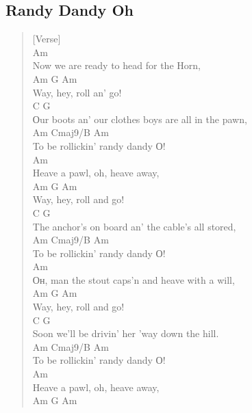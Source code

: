 \documentclass[11pt]{article}
\begin{document}
\subsection{Randy Dandy Oh}
\label{sec:org2eb318b}
\begin{verse}
[Verse]\\
\hspace*{1em}Am\\
Now we are ready to head for the Horn,\\
Am   G    Am\\
Way, hey, roll an' go!\\
\hspace*{4em}C                              G\\
Оur boots an' our clothes boys are all in the pawn,\\
\hspace*{6em}Am              Cmaj9/B  Am\\
To be rollickin' randy dandy О!\\
\vspace*{1em}
Am\\
Heave a pawl, oh, heave away,\\
Am   G    Am\\
Way, hey, roll and go!\\
\hspace*{5em}C                        G\\
The anchor's on board an' the cable's all stored,\\
\hspace*{7em}Am              Cmaj9/B  Am\\
To be rollickin' randy dandy О!\\
\vspace*{1em}
Am\\
Он, man the stout caps'n and heave with a will,\\
Am   G    Am\\
Way, hey, roll and go!\\
C                         G\\
Soon we'll be drivin' her 'way down the hill.\\
\hspace*{8em}Am              Cmaj9/B  Am\\
To be rollickin' randy dandy О!\\
\vspace*{1em}
Am\\
Heave a pawl, oh, heave away,\\
Am   G    Am\\

\end{verse}
\end{document}

